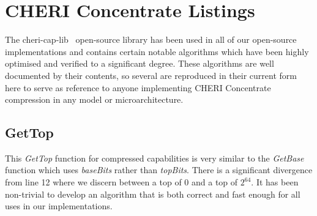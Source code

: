 \chapter{CHERI Concentrate Listings}
\label{app:cheri-128-listings}

The cheri-cap-lib~\cite{CHERI-cheri-cap-lib} open-source library has been used in all of our open-source~\cite{CHERI-cheri-cpu,CHERI-Piccolo,CHERI-Flute,CHERI-Toooba} implementations and contains certain notable algorithms which have been highly optimised and verified to a significant degree.
These algorithms are well documented by their contents, so several are reproduced in their current form here to serve as reference to anyone implementing CHERI Concentrate compression in any model or microarchitecture.


\section{GetTop}
\label{sec:cheri-128-listings-gettop}

This \emph{GetTop} function for compressed capabilities is very similar to the \emph{GetBase} function which uses \emph{baseBits} rather than \emph{topBits}.
There is a significant divergence from line 12 where we discern between a top of 0 and a top of $2^{64}$.
It has been non-trivial to develop an algorithm that is both correct and fast enough for all uses in our implementations.

